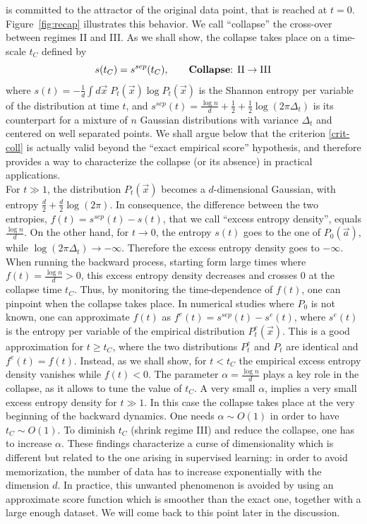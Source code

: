 \documentclass[10pt,twocolumn]{article}
\newcommand{\vx}{\vec x}
\newcommand{\va}{\vec a}
\begin{document}
is committed to the attractor of the original data point, that is reached at $t=0$.  Figure~\ref{fig:recap} illustrates this behavior.
We call ``collapse'' the cross-over between regimes II and III. 
As we shall show, the collapse takes place on a time-scale $t_C$ defined by
\begin{equation}\label{crit-coll}
  s(t_C)= s^{sep}(t_C),
\qquad \text{{\bf Collapse}: II}\rightarrow \text{III}
\end{equation}
where $s(t)=-\frac{1}{d} \int d\vx \; P_t(\vx) \log P_t(\vx)$ is the Shannon entropy per variable of the distribution at time $t$, and $s^{sep}(t) = \frac{\log n}{d} + \frac{1}{2} + \frac{1}{2}\log (2\pi \Delta_{t})$ is its counterpart for a mixture of $n$ Gaussian distributions  with variance $\Delta_t$ and centered on well separated points.
We shall argue below that the criterion \eqref{crit-coll} is actually valid beyond the ``exact empirical score'' hypothesis, and therefore provides a way to characterize the collapse (or its absence) in practical applications.  \\
For $t\gg 1$, the distribution $P_t(\vx)$ becomes a $d$-dimensional Gaussian, with entropy  $\frac{d}{2} + \frac{d}{2}\log (2\pi )$. In consequence, the difference between the two entropies,  
$f(t)=s^{sep}(t)-s(t)$, that we call ``excess entropy density'', equals $\frac{\log n}{d}$.
On the other hand, for $t\rightarrow 0$, the entropy $s(t)$ goes to the one of  $P_0(\va)$, while $\log (2\pi \Delta_{t})\to -\infty$. Therefore the excess entropy density goes to $-\infty$. When running the backward process, starting form large times where $f(t)=\frac{\log n}{d}>0$, this excess entropy density decreases and crosses $0$
at the collapse time $t_C$. Thus, by monitoring the time-dependence of $f(t)$, one can pinpoint when the collapse takes place. In numerical studies where $P_0$ is not known, one can approximate $f(t)$ as $f^e(t)=s^{sep}(t)-s^e(t)$, where $s^e(t)$ is the entropy per variable of the empirical distribution $P^e_t (\vx)$. This is a good approximation for $t\ge t_C$, where the two distributions $P^e_t$ and $P_t$ are identical and $f^e(t)=f(t)$. Instead, as we shall show, for $t<t_C$ the empirical excess entropy density vanishes while $f(t)<0$. 
The parameter $\alpha=\frac{\log n}{d}$ plays a key role in the collapse, as it allows to tune the value of $t_C$. A very small $\alpha$, implies a very small excess entropy density for $t\gg 1$. In this case the collapse takes place at the very beginning of the backward dynamics. One needs $\alpha \sim O(1)$ in order to have $t_C\sim O(1)$. To diminish $t_C$ (shrink regime III) and reduce the collapse, one has to increase $\alpha$. These findings characterize a curse of dimensionality which is different but related to the one arising in supervised learning: in order to avoid memorization, the number of data has to increase exponentially with the dimension $d$.
In practice, this unwanted  phenomenon is avoided by using an approximate score function which is smoother than the exact one, together with a large enough dataset. We will come back to this point later in the discussion. 
\end{document}

